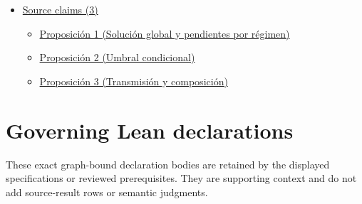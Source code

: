\documentclass[10pt]{article}
\begin{document}
\begin{itemize}[leftmargin=1.2em]
\begin{itemize}[leftmargin=1.2em]
\item \hyperlink{paper-prerequisite-527f5e3e1ca86ece}{Galarza26\allowbreak{}Relative\allowbreak{}Credit.\allowbreak{}impaired\allowbreak{}Balance}
\item \hyperlink{paper-prerequisite-3b6383e0216b3c72}{Galarza26\allowbreak{}Relative\allowbreak{}Credit.\allowbreak{}relative\allowbreak{}Price}
\item \hyperlink{paper-prerequisite-38fc4c8d2be8054c}{Galarza26\allowbreak{}Relative\allowbreak{}Credit.\allowbreak{}relative\allowbreak{}Price\_\allowbreak{}eq\_\allowbreak{}rate\_\allowbreak{}gap}
\item \hyperlink{paper-prerequisite-e9553b2c455b69dd}{Galarza26\allowbreak{}Relative\allowbreak{}Credit.\allowbreak{}screened\allowbreak{}Risk}
\item \hyperlink{paper-prerequisite-ab0e2f9b84884bc6}{Galarza26\allowbreak{}Relative\allowbreak{}Credit.\allowbreak{}selection\allowbreak{}And\allowbreak{}Domain}
\item \hyperlink{paper-prerequisite-de4cba6057d51d83}{Galarza26\allowbreak{}Relative\allowbreak{}Credit.\allowbreak{}stock\allowbreak{}Accounting\allowbreak{}Conditions}
\item \hyperlink{paper-prerequisite-e5f9b7ce782f743a}{Galarza26\allowbreak{}Relative\allowbreak{}Credit.\allowbreak{}technology\allowbreak{}Capacity\allowbreak{}Cost}
\end{itemize}
\item \hyperlink{source-section-f10b5f68e4acf3dc}{Source claims (3)}
\begin{itemize}[leftmargin=1.2em]
\item \hyperlink{source-claim-71d1c57a6546a5a7}{Proposición 1 (Solución global y pendientes por régimen)}
\item \hyperlink{source-claim-f0d8e27dfc3b3ee3}{Proposición 2 (Umbral condicional)}
\item \hyperlink{source-claim-194f750a63a93998}{Proposición 3 (Transmisión y composición)}
\end{itemize}
\end{itemize}

\clearpage
\hypertarget{governing-declaration-section-5ef5ef0364b6939c}{}
\section*{Governing Lean declarations}
These exact graph-bound declaration bodies are retained by the displayed specifications or reviewed prerequisites. They are supporting context and do not add source-result rows or semantic judgments.
\hypertarget{governing-declaration-34d15e1983b4c930}{}
\end{document}
